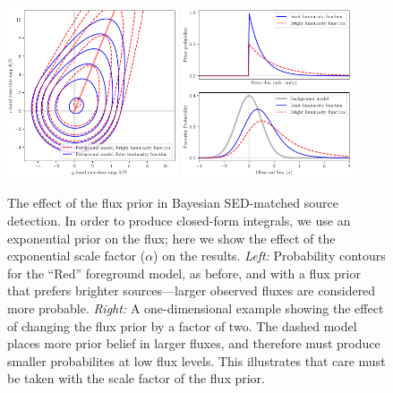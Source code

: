 \documentclass[11pt,letterpaper,linenumbers]{aastex63}
\begin{document}
\begin{figure}
    \begin{center}
    \includegraphics[width=0.45\textwidth]{prob-contours-c}
    \includegraphics[width=0.45\textwidth]{prob-1d}
    \caption{The effect of the flux prior in Bayesian
      SED-matched source detection.  In order to produce closed-form
      integrals, we use an exponential prior on the flux; here
      we show the effect of the exponential scale factor ($\alpha$) on
      the results.  \emph{Left:} Probability contours for the ``Red''
      foreground model, as before, and with a flux prior that
      prefers brighter sources---larger observed fluxes are considered
      more probable.  \emph{Right:} A one-dimensional example showing
      the effect of changing the flux prior by a factor of
      two.  The dashed model places more prior belief in larger
      fluxes, and therefore must produce smaller probabilites at low
      flux levels.  This illustrates that care must be taken with the
      scale factor of the flux prior.
      \label{fig:scaling}
    }
    \end{center}
\end{figure}
\end{document}
